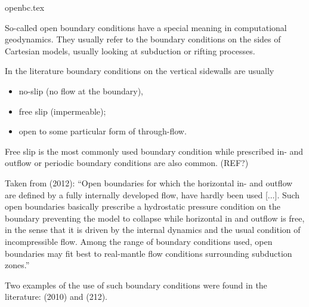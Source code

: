 \begin{flushright} {\tiny {\color{gray} openbc.tex}} \end{flushright}

So-called open boundary conditions have a special meaning in computational geodynamics. 
They usually refer to the boundary conditions on the sides of Cartesian models, 
usually looking at subduction or rifting processes. 

In the literature boundary conditions on the vertical sidewalls are usually 
\begin{itemize}
\item no-slip (no flow at the boundary), 
\item free slip (impermeable); 
\item open to some particular form of through-flow.
\end{itemize}

Free slip is the most commonly used boundary condition while prescribed in- and outflow 
or periodic boundary conditions are also common. (REF?)

Taken from \textcite{chgv12} (2012):
``Open boundaries for which the horizontal in- and outflow are defined by a fully 
internally developed flow, have hardly been used [...]. 
Such open boundaries basically prescribe a hydrostatic pressure condition on 
the boundary preventing the model to collapse while horizontal in and outflow is free, 
in the sense that it is driven by the internal dynamics and the usual condition of 
incompressible flow. 
Among the range of boundary conditions used, open boundaries may fit best to 
real-mantle flow conditions surrounding subduction zones.''

Two examples of the use of such boundary conditions were found in 
the literature: \textcite{qusp10} (2010) and \textcite{chgv12} (212).


